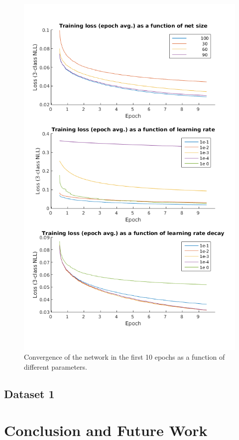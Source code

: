 \documentclass{acm_proc_article-sp}
\begin{document}
\begin{figure}
 \centering
 \includegraphics[scale=.5]{./figures/parameterSearch.png}
 \caption{Convergence of the network in the first 10 epochs as a function of different parameters.}
 \label{fig:paramSearch}
\end{figure}


\subsection{Dataset 1}

\section{Conclusion and Future Work}
\label{sec:Conclusion and Future Work}
\end{document}
